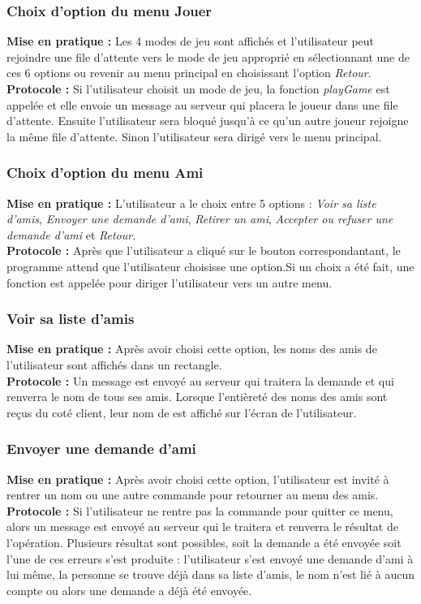 \documentclass[10pt, a4paper]{article}
\begin{document}
\subsubsection{Choix d'option du menu Jouer}
\textbf{Mise en pratique :} Les 4 modes de jeu sont affichés et l'utilisateur peut rejoindre une file d'attente vers le mode de jeu approprié en sélectionnant une de ces 6 options ou revenir au menu principal en choisissant l'option \textit{Retour}.\\
\textbf{Protocole :} Si l'utilisateur choisit un mode de jeu, la fonction \textit{playGame} est appelée et elle envoie un message au serveur qui placera le joueur dans une file d'attente. Ensuite l'utilisateur sera bloqué jusqu'à ce qu'un autre joueur rejoigne la même file d'attente. Sinon l'utilisateur sera dirigé vers le menu principal.\\

\subsubsection{Choix d'option du menu Ami}
\textbf{Mise en pratique :} L'utilisateur a le choix entre 5 options : \textit{Voir sa liste d'amis}, \textit{Envoyer une demande d'ami}, \textit{Retirer un ami}, \textit{Accepter ou refuser une demande d'ami} et \textit{Retour}.\\
\textbf{Protocole :} Après que l'utilisateur a cliqué sur le bouton correspondantant, le programme attend que l'utilisateur choisisse une option.Si un choix a été fait, une fonction est appelée pour diriger l'utilisateur vers un autre menu. \\

\subsubsection{Voir sa liste d'amis}
\textbf{Mise en pratique :} Après avoir choisi cette option, les noms des amis de l'utilisateur sont affichés dans un rectangle.\\
\textbf{Protocole :} Un message est envoyé au serveur qui traitera la demande et qui renverra le nom de tous ses amis. Lorsque l'entièreté des noms des amis sont reçus du coté client,  leur nom de est affiché sur l'écran de l'utilisateur.\\

\subsubsection{Envoyer une demande d'ami}
\textbf{Mise en pratique :} Après avoir choisi cette option, l'utilisateur est invité à rentrer un nom ou une autre commande pour retourner au menu des amis.\\
\textbf{Protocole :} Si l'utilisateur ne rentre pas la commande pour quitter ce menu, alors un message est envoyé au serveur qui le traitera et renverra le résultat de l'opération. Plusieurs résultat sont possibles, soit la demande a été envoyée soit l'une de ces erreurs s'est produite : l'utilisateur s'est envoyé une demande d'ami à lui même, la personne se trouve déjà dans sa liste d'amis, le nom n'est lié à aucun compte ou alors une demande a déjà été envoyée. \\
\end{document}

